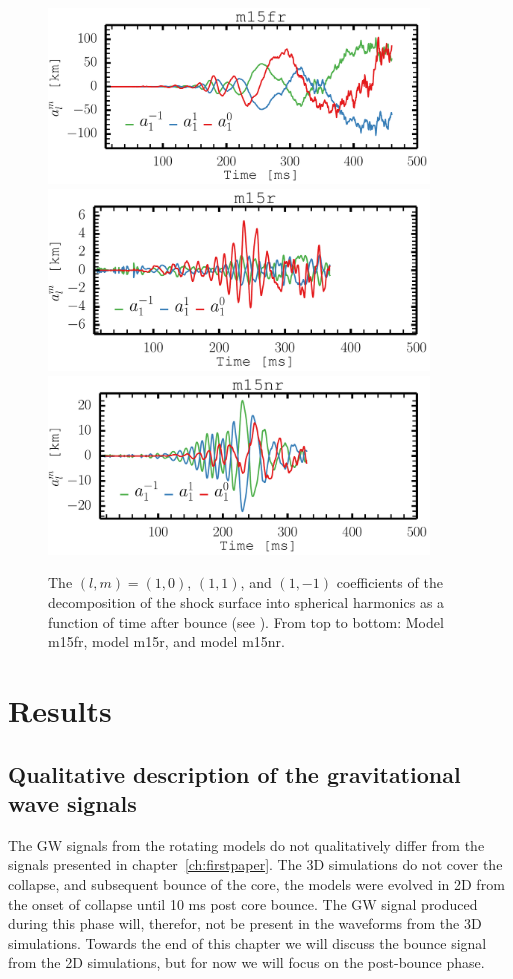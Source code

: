 \begin{figure}[ht]         
\centering                            
\includegraphics[width=0.9\textwidth]{./images/paper2/sasi_fr.pdf}
\includegraphics[width=0.9\textwidth]{./images/paper2/sasi_r.pdf}
\includegraphics[width=0.9\textwidth]{./images/paper2/sasi_nr.pdf}
\caption{The $(l,m) = (1,0)$, $(1,1)$, and $(1,-1)$ coefficients of the decomposition of the shock surface into spherical harmonics
as a function of time after bounce (see ). From top to bottom: Model m15fr, model m15r, and model m15nr. \label{figp2:sasi}}
\end{figure}

\section{Results}
\subsection{Qualitative description of the gravitational wave signals}
The GW signals from the rotating models do not qualitatively differ from
the signals presented in chapter~\ref{ch:firstpaper}. The 3D simulations do not cover the collapse, and subsequent bounce of the core,
the models were evolved in 2D from the onset of collapse until 10 ms post core bounce. 
The GW signal produced during this phase will, therefor, not be present in the waveforms from the 3D simulations. 
Towards the end of this chapter we will discuss the bounce signal from the 2D simulations,
but for now we will focus on the post-bounce phase. 

